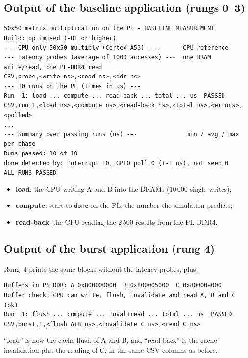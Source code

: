 \documentclass[11pt,a4paper]{article}
\newcommand{\code}[1]{\texttt{#1}}
\renewcommand{\_}{\oldunderscore\allowbreak{}}
\begin{document}
\subsection{Output of the baseline application (rungs 0--3)}
\begin{lstlisting}
50x50 matrix multiplication on the PL - BASELINE MEASUREMENT
Build: optimised (-O1 or higher)
--- CPU-only 50x50 multiply (Cortex-A53) ---       CPU reference
--- Latency probes (average of 1000 accesses) ---  one BRAM write/read, one PL-DDR4 read
CSV,probe,<write ns>,<read ns>,<ddr ns>
--- 10 runs on the PL (times in us) ---
Run  1: load ... compute ... read-back ... total ... us  PASSED
CSV,run,1,<load ns>,<compute ns>,<read-back ns>,<total ns>,<errors>,<polled>
...
--- Summary over passing runs (us) ---              min / avg / max per phase
Runs passed: 10 of 10
done detected by: interrupt 10, GPIO poll 0 (+-1 us), not seen 0
ALL RUNS PASSED
\end{lstlisting}
\begin{itemize}[noitemsep]
  \item \textbf{load}: the CPU writing A and B into the BRAMs (10\,000 single writes);
  \item \textbf{compute}: start to \code{done} on the PL, the number the simulation predicts;
  \item \textbf{read-back}: the CPU reading the 2\,500 results from the PL DDR4.
\end{itemize}

\subsection{Output of the burst application (rung 4)}
Rung~4 prints the same blocks without the latency probes, plus:
\begin{lstlisting}
Buffers in PS DDR: A 0x800000000  B 0x800005000  C 0x80000a000
Buffer check: CPU can write, flush, invalidate and read A, B and C (ok)
Run  1: flush ... compute ... inval+read ... total ... us  PASSED
CSV,burst,1,<flush A+B ns>,<invalidate C ns>,<read C ns>
\end{lstlisting}
``load'' is now the cache flush of A and B, and ``read-back'' is the cache invalidation plus the reading of C, in the same CSV columns as before.
\end{document}

